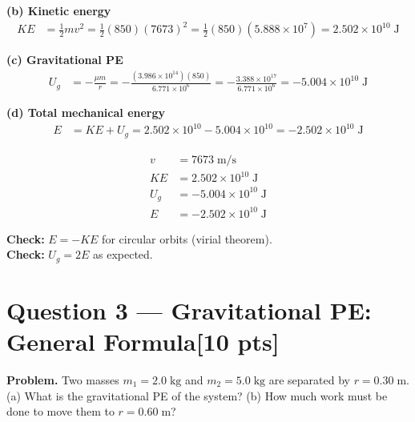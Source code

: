 \documentclass[12pt,letterpaper]{article}
\newcommand{\units}[1]{\;\text{#1}}
\newcommand{\pts}[1]{\hfill\textcolor{TorontoBlue60}{[#1 pts]}}
\begin{document}
\textbf{(b) Kinetic energy}
\begin{align}
  KE &= \tfrac{1}{2}mv^2 = \tfrac{1}{2}(850)(7673)^2
      = \tfrac{1}{2}(850)(5.888\times10^{7})
      = 2.502\times10^{10}\units{J} \label{eq:q2ke}
\end{align}

\textbf{(c) Gravitational PE}
\begin{align}
  U_g &= -\frac{\mu m}{r} = -\frac{(3.986\times10^{14})(850)}{6.771\times10^{6}}
       = -\frac{3.388\times10^{17}}{6.771\times10^{6}}
       = -5.004\times10^{10}\units{J} \label{eq:q2ug}
\end{align}

\textbf{(d) Total mechanical energy}
\begin{align}
  E &= KE + U_g = 2.502\times10^{10} - 5.004\times10^{10}
     = -2.502\times10^{10}\units{J} \label{eq:q2e}
\end{align}

\begin{tcolorbox}[answerbox]
\begin{align*}
  v   &= 7673\units{m/s} \\
  KE  &= 2.502\times10^{10}\units{J} \\
  U_g &= -5.004\times10^{10}\units{J} \\
  E   &= -2.502\times10^{10}\units{J}
\end{align*}
\end{tcolorbox}

\begin{tcolorbox}[checkbox]
\textbf{Check:} $E = -KE$ for circular orbits (virial theorem). \checkmark\\
\textbf{Check:} $U_g = 2E$ as expected. \checkmark
\end{tcolorbox}

\newpage

\section{Question 3 --- Gravitational PE: General Formula\pts{10}}
\label{sec:q3}

\textbf{Problem.} Two masses $m_1 = 2.0\units{kg}$ and $m_2 = 5.0\units{kg}$ are
separated by $r = 0.30\units{m}$. (a) What is the gravitational PE of the system?
(b) How much work must be done to move them to $r = 0.60\units{m}$?
\end{document}
